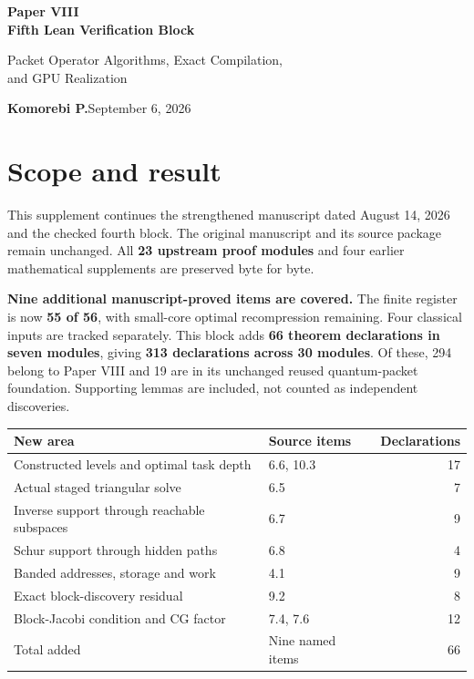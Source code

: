 \documentclass[11pt]{article}
\begin{document}
{\LARGE\bfseries\color{ink} Paper VIII\\[3pt] Fifth Lean Verification Block}\par
{\large Packet Operator Algorithms, Exact Compilation,\\and GPU Realization}\par
\textbf{Komorebi P.}\hfill September 6, 2026

\section*{\color{ink}Scope and result}
This supplement continues the strengthened manuscript dated August 14, 2026 and the checked fourth block. The original manuscript and its source package remain unchanged. All \textbf{23 upstream proof modules} and four earlier mathematical supplements are preserved byte for byte.

\textbf{Nine additional manuscript-proved items are covered.} The finite register is now \textbf{55 of 56}, with small-core optimal recompression remaining. Four classical inputs are tracked separately. This block adds \textbf{66 theorem declarations in seven modules}, giving \textbf{313 declarations across 30 modules}. Of these, 294 belong to Paper VIII and 19 are in its unchanged reused quantum-packet foundation. Supporting lemmas are included, not counted as independent discoveries.

\begin{center}\small
\renewcommand{\arraystretch}{1.28}
\begin{tabular}{@{}p{}p{}r@{}}
\toprule
New area & Source items & Declarations\\
\midrule
Constructed levels and optimal task depth & 6.6, 10.3 & 17\\
Actual staged triangular solve & 6.5 & 7\\
Inverse support through reachable subspaces & 6.7 & 9\\
Schur support through hidden paths & 6.8 & 4\\
Banded addresses, storage and work & 4.1 & 9\\
Exact block-discovery residual & 9.2 & 8\\
Block-Jacobi condition and CG factor & 7.4, 7.6 & 12\\
\midrule
Total added & Nine named items & 66\\
\bottomrule
\end{tabular}
\end{center}
\end{document}

